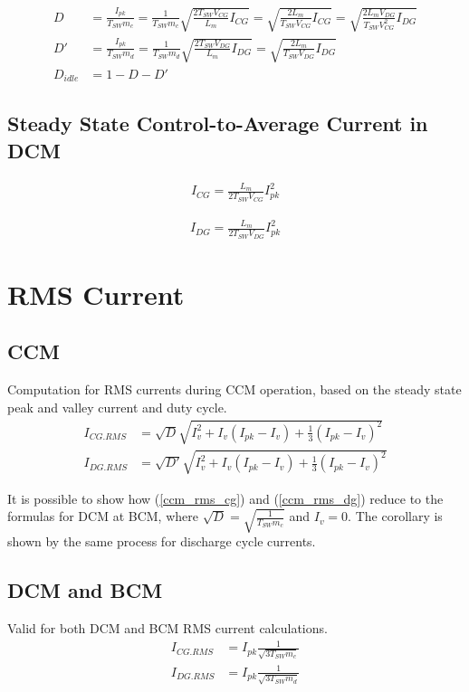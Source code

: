 \documentclass{scrartcl}
\begin{document}
		\begin{align}
		D &= \frac{ I_{pk}}{ T_{SW} m_{c}} = \frac{1}{ T_{SW} m_{c}} \sqrt{\frac{2T_{SW}V_{CG}}{L_m}I_{CG}} =  \sqrt{\frac{2 L_m}{T_{SW} V_{CG}}I_{CG}} = \sqrt{\frac{2 L_m V_{DG}}{T_{SW}V_{CG}^2}I_{DG}} \\
		D' &= \frac{ I_{pk}}{ T_{SW} m_{d}} = \frac{1}{ T_{SW} m_{d}} \sqrt{\frac{2T_{SW}V_{DG}}{L_m}I_{DG}}	 = \sqrt{\frac{2L_m} {T_{SW} V_{DG} }I_{DG}} \\
		D_{idle} &= 1 - D - D'
		\end{align}			
				
		\subsection{Steady State Control-to-Average Current in DCM}

		\begin{align}
		I_{CG} = \frac{L_m}{2T_{SW}V_{CG}}I_{pk}^2 \label{dcm_c2cg_ss}
		\end{align}	

		\begin{align}
		I_{DG} = \frac{L_m}{2T_{SW}V_{DG}}I_{pk}^2 \label{dcm_c2dg_ss}
		\end{align}	
	
	\section{RMS Current}
	
	\subsection{CCM}
	Computation for RMS currents during CCM operation, based on the steady state peak and valley current and duty cycle.
	\begin{align}	
		I_{CG.RMS} &= \sqrt{D}\sqrt{I_v^2 + I_v(I_{pk}-I_v) + \frac{1}{3}(I_{pk}-I_v)^2} \label{ccm_rms_cg} \\
		I_{DG.RMS} &= \sqrt{D'}\sqrt{I_v^2 + I_v(I_{pk}-I_v) + \frac{1}{3}(I_{pk}-I_v)^2} \label{ccm_rms_dg}
	\end{align}	
	
	It is possible to show how (\ref{ccm_rms_cg}) and (\ref{ccm_rms_dg}) reduce to the formulas for DCM at BCM, where $\sqrt{D} = \sqrt{\frac{1}{T_{SW}m_c}}$ and $I_v=0$.  The corollary is shown by the same process for discharge cycle currents. 
	
	\subsection{DCM and BCM}
	Valid for both DCM and BCM RMS current calculations. 
	\begin{align}	
		I_{CG.RMS} &= I_{pk} \frac{1}{\sqrt{3T_{SW}m_c}} \\
		I_{DG.RMS} &= I_{pk} \frac{1}{\sqrt{3T_{SW}m_d}} 
	\end{align}
	
\end{document}
